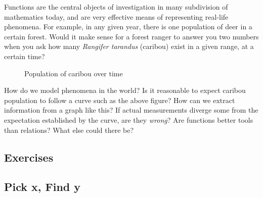 


Functions are the central objects of investigation in many subdivision of mathematics today, and
are very effective means of representing real-life phenomena. For example, in any given year, 
there is one population of
deer in a certain forest.  Would it make sense for a forest ranger to answer you two numbers when
you ask how many \textit{Rangifer tarandus} (caribou) exist in a given range, at a certain time?


\begin{figure}[h]
\centering
{}
\caption{Population of caribou over time}
\end{figure}

How do we model phenomena in the world?  Is it reasonable to expect
caribou population to follow a curve such as the above figure?  How can we 
extract information from a graph like this?  If actual measurements diverge some
from the expectation established by the curve, are they \emph{wrong}?  Are functions
better tools than relations?  What else could there be?

\newpage
\chapterminitoc




\newpage
{}
\newpage

\newpage
\subsection{Exercises}



\newpage
{}
\subsection{Pick x, Find y}
\newpage

\newpage
